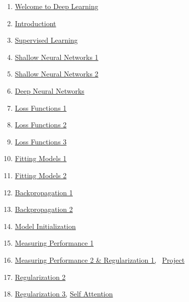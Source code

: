 \documentclass[11pt]{article}
\begin{document}
\begin{multicols}{2}
	\begin{enumerate}
		\item  \href{https://mp.weixin.qq.com/s/VgAgeYBK-TPdCPiFz8piWQ}{Welcome to Deep Learning} %
		\item  \href{https://mp.weixin.qq.com/s/I1ZkMHsHMpBmB2P-Wd-FDA}{Introductiont} %
		\item  \href{https://mp.weixin.qq.com/s/WjN0zZfA0JRaGVL6bYN0qw}{Supervised Learning} %
		\item  \href{https://mp.weixin.qq.com/s/s0kax_sE3qcJ81zXFi2XFg}{Shallow Neural Networks 1} %
		\item  \href{https://mp.weixin.qq.com/s/5fSP7aSGIWwuV_x1PZ0r_Q}{Shallow Neural Networks 2} %
		\item  \href{https://mp.weixin.qq.com/s/eyNmiR3Ixj1BZY75lhlqOA}{Deep Neural Networks} %
		\item  \href{https://mp.weixin.qq.com/s/v6BTK-NhGhjMzk3p7Bm49g}{Loss Functions 1} %
		\item  \href{https://mp.weixin.qq.com/s/CgO7_amuSjGESD9KsklowQ}{Loss Functions 2} %
		\item  \href{https://mp.weixin.qq.com/s/DzKhDRGdnEGrG3b-uyB4FA}{Loss Functions 3} %
		\item  \href{https://mp.weixin.qq.com/s/Lo6HUyHxLJ4GyzGGtHy7xQ}{Fitting Models 1} %
		\item  \href{https://mp.weixin.qq.com/s/cJDOX9FwXXXsB81ish3JTA}{Fitting Models 2} %
		\item  \href{https://mp.weixin.qq.com/s/DEXYTY3YwBLKc7g82PBLsg}{Backpropagation 1} %
		\item  \href{https://mp.weixin.qq.com/s/Tuc6nGMaqjXV_ShEuP8p_w}{Backpropagation 2} %
		\item  \href{https://mp.weixin.qq.com/s/Xn7irlom3mgNRrj8TDzqag}{Model Initialization} %
		\item  \href{https://mp.weixin.qq.com/s/rHOmr_-AIr9AXl9sAbiL7Q}{Measuring Performance 1} %
		\item  \href{https://mp.weixin.qq.com/s/XmoP7DDNilLe8ljawSjeXw}{Measuring Performance 2 \& Regularization 1,} \  \href{https://mp.weixin.qq.com/s/6k16yrFauulrpy_uz0xbIQ}{Project} %
		\item  \href{https://mp.weixin.qq.com/s/eDH5eEQasuUQtEOV4BS42w}{Regularization 2}%
		\item  \href{https://mp.weixin.qq.com/s/rqgu3qDoRbte3iRV3F26_Q}{Regularization 3,} \href{https://mp.weixin.qq.com/s/IL_RXcSkDg1NWt92txY26A}{Self Attention}%

\end{enumerate}
\end{multicols}
\end{document}
